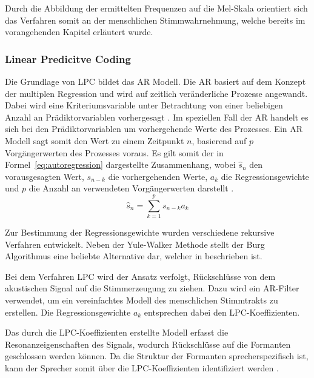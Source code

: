 Durch die Abbildung der ermittelten Frequenzen auf die Mel-Skala orientiert sich das Verfahren somit an der menschlichen Stimmwahrnehmung, welche bereits im vorangehenden Kapitel erläutert wurde.

\subsubsection{Linear Predicitve Coding}

\textauthor{\vHS}{}{}

Die Grundlage von \ac{LPC} bildet das \ac{AR} Modell.
Die \ac{AR} basiert auf dem Konzept der multiplen Regression und wird auf zeitlich veränderliche Prozesse angewandt.
Dabei wird eine Kriteriumsvariable unter Betrachtung von einer beliebigen Anzahl an Prädiktorvariablen vorhergesagt \autocite[vgl.][S. 37-38]{canela_multiple_2019}.
Im speziellen Fall der \ac{AR} handelt es sich bei den Prädiktorvariablen um vorhergehende Werte des Prozesses.
Ein \ac{AR} Modell sagt somit den Wert zu einem Zeitpunkt $n$, basierend auf $p$ Vorgängerwerten des Prozesses voraus.
Es gilt somit der in Formel~\ref{eq:autoregression} dargestellte Zusammenhang, wobei $\hat{s}_n$ den vorausgesagten Wert, $s_{n-k}$ die vorhergehenden Werte, $a_{k}$ die Regressionsgewichte und $p$ die Anzahl an verwendeten Vorgängerwerten darstellt \autocite[][S. 1304]{atal_effectiveness_1974}.
\begin{equation}
  \hat{s}_{n} = \sum_{k=1}^{p} s_{n-k}a_{k}
  \label{eq:autoregression}
\end{equation}

Zur Bestimmung der Regressionsgewichte wurden verschiedene rekursive Verfahren entwickelt.
Neben der Yule-Walker Methode stellt der Burg Algorithmus eine beliebte Alternative dar, welcher in \citeauthor[][S. 443]{marple_new_1980} beschrieben ist.

Bei dem Verfahren \ac{LPC} wird der Ansatz verfolgt, Rückschlüsse von dem akustischen Signal auf die Stimmerzeugung zu ziehen.
Dazu wird ein \ac{AR}-Filter verwendet, um ein vereinfachtes Modell des menschlichen Stimmtrakts zu erstellen.
Die Regressionsgewichte $a_k$ entsprechen dabei den \ac{LPC}-Koeffizienten.

Das durch die \ac{LPC}-Koeffizienten erstellte Modell erfasst die Resonanzeigenschaften des Signals, wodurch Rückschlüsse auf die Formanten geschlossen werden können.
Da die Struktur der Formanten sprecherspezifisch ist, kann der Sprecher somit über die \ac{LPC}-Koeffizienten identifiziert werden \autocite[vgl.][S. 117]{sidorov_text-independent_2010}.

